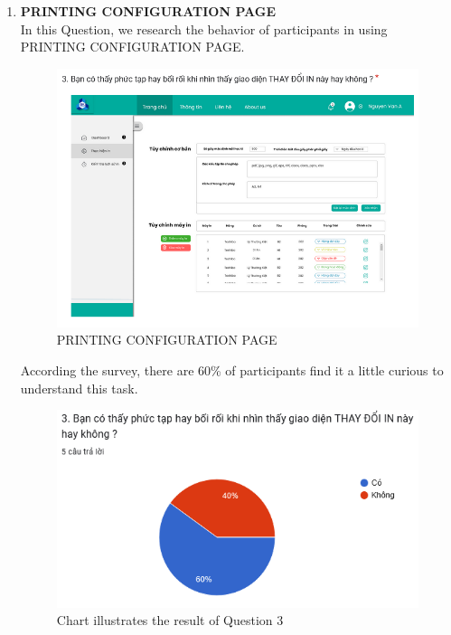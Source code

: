 \begin{enumerate}
    \item \textbf{PRINTING CONFIGURATION PAGE} \\
    In this Question, we research the behavior of participants in using PRINTING CONFIGURATION PAGE.
\begin{figure}[!h]
    \centering
    \includegraphics[width=0.8\linewidth]{images/image_uasbility/Q3_SPSO.png}
    \caption{PRINTING CONFIGURATION PAGE}
    \label{fig:PRINTING CONFIGURATION}
\end{figure}
\newpage
According the survey, there are 60\% of participants find it a little curious to understand this task.
\begin{figure}[!h]
    \centering
    \includegraphics[width=0.8\linewidth]{images/image_uasbility/A3_SPSO.png}
    \caption{Chart illustrates the result of Question 3}
    \label{fig:Chart illustrates the result of Question 3}
\end{figure}



\end{enumerate}
